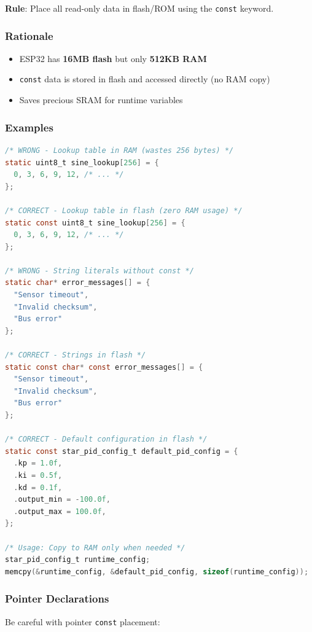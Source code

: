 \textbf{Rule}: Place all read-only data in flash/ROM using the \texttt{const} keyword.

\subsubsection{Rationale}

\begin{itemize}
\item ESP32 has \textbf{16MB flash} but only \textbf{512KB RAM}
\item \texttt{const} data is stored in flash and accessed directly (no RAM copy)
\item Saves precious SRAM for runtime variables
\end{itemize}

\subsubsection{Examples}

\begin{lstlisting}[language=C]
/* WRONG - Lookup table in RAM (wastes 256 bytes) */
static uint8_t sine_lookup[256] = {
  0, 3, 6, 9, 12, /* ... */
};

/* CORRECT - Lookup table in flash (zero RAM usage) */
static const uint8_t sine_lookup[256] = {
  0, 3, 6, 9, 12, /* ... */
};

/* WRONG - String literals without const */
static char* error_messages[] = {
  "Sensor timeout",
  "Invalid checksum",
  "Bus error"
};

/* CORRECT - Strings in flash */
static const char* const error_messages[] = {
  "Sensor timeout",
  "Invalid checksum",
  "Bus error"
};

/* CORRECT - Default configuration in flash */
static const star_pid_config_t default_pid_config = {
  .kp = 1.0f,
  .ki = 0.5f,
  .kd = 0.1f,
  .output_min = -100.0f,
  .output_max = 100.0f,
};

/* Usage: Copy to RAM only when needed */
star_pid_config_t runtime_config;
memcpy(&runtime_config, &default_pid_config, sizeof(runtime_config));


\end{lstlisting}
\subsubsection{Pointer Declarations}

Be careful with pointer \texttt{const} placement:

